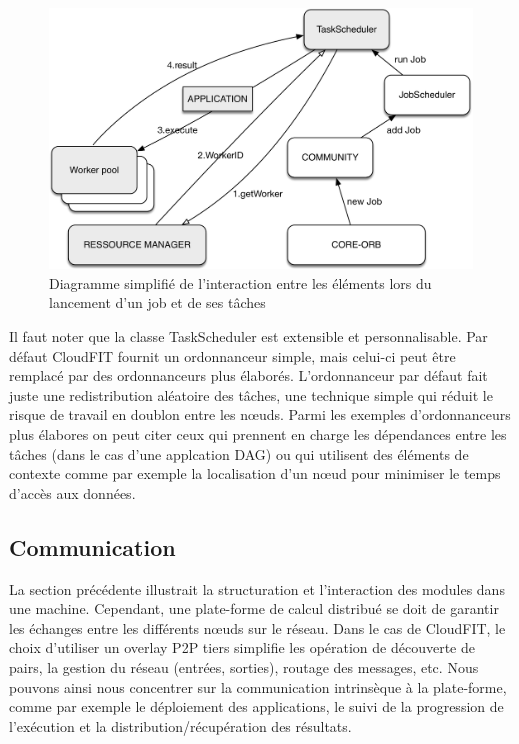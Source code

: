 \begin{figure}
	\begin{center}
		\includegraphics[width=0.65\linewidth]{img/CloudFITstack-app}
		\caption{Diagramme simplifié de l'interaction entre les éléments lors du lancement d'un job et de ses tâches}\label{Figure:applayer}
	\end{center}
\end{figure}

Il faut noter que la classe TaskScheduler est extensible et personnalisable. Par défaut CloudFIT fournit un ordonnanceur simple, mais celui-ci peut être remplacé par des ordonnanceurs plus élaborés. L'ordonnanceur par défaut fait juste une redistribution aléatoire des tâches, une technique simple qui réduit le risque de travail en doublon entre les n{\oe}uds. Parmi les exemples d'ordonnanceurs plus élabores on peut citer ceux qui prennent en charge les dépendances entre les tâches (dans le cas d'une applcation DAG) ou qui utilisent des éléments de contexte comme par exemple la localisation d'un n{\oe}ud pour minimiser le temps d'accès aux données. 




\subsection{Communication\label{subsec:commCloudFIT}}

La section précédente illustrait la structuration et l'interaction des modules dans une machine. Cependant, une plate-forme de calcul distribué se doit de garantir les échanges entre les différents n{\oe}uds sur le réseau. Dans le cas de CloudFIT, le choix d'utiliser un overlay P2P tiers simplifie les opération de découverte de pairs, la gestion du réseau (entrées, sorties), routage des messages, etc. Nous pouvons ainsi nous concentrer sur la communication intrinsèque à la plate-forme, comme par exemple le déploiement des applications, le suivi de la progression de l'exécution et la distribution/récupération des résultats. 

